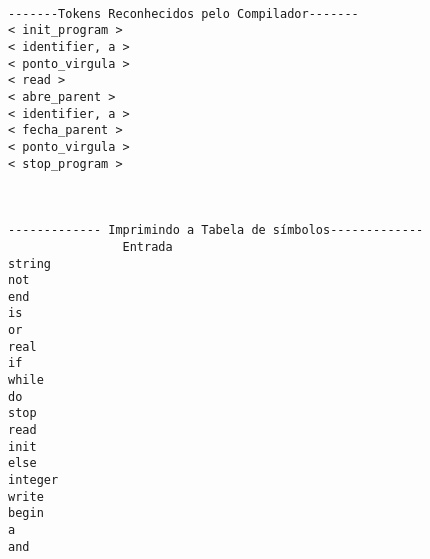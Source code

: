 \begin{lstlisting}[caption={Saida para o Codigo de teste  : Teste10.txt},label={Entrada 1},language=Comsol]

-------Tokens Reconhecidos pelo Compilador-------
< init_program >
< identifier, a >
< ponto_virgula >
< read >
< abre_parent >
< identifier, a >
< fecha_parent >
< ponto_virgula >
< stop_program >



------------- Imprimindo a Tabela de símbolos-------------
                Entrada
string
not
end
is
or
real
if
while
do
stop
read
init
else
integer
write
begin
a
and
              
\end{lstlisting}



\newline
\newline
